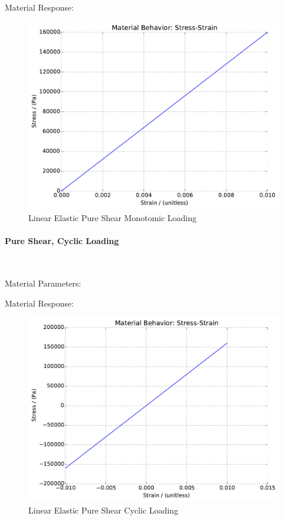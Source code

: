 \documentclass[fleqn,11pt]{article}
\begin{document}
Material Response:
\begin{figure}[H]
\begin{center}
\includegraphics[width=12cm]{../fei_examples/2_1_linear_elastic/1pure_shear_mono_loading/result.pdf}
\caption{
\label{linear_elastic_shear_mono}
Linear Elastic Pure Shear Monotomic Loading}
\end{center}
\end{figure}

\newpage
\paragraph{Pure Shear, Cyclic Loading} ~ 

Material Parameters:


Material Response:
\begin{figure}[H]
\begin{center}
\includegraphics[width=12cm]{../fei_examples/2_1_linear_elastic/2pure_shear_cyclic_loading/result.pdf}
\caption{
\label{linear_elastic_shear_mono}
Linear Elastic Pure Shear Cyclic Loading}
\end{center}
\end{figure}
\end{document}
